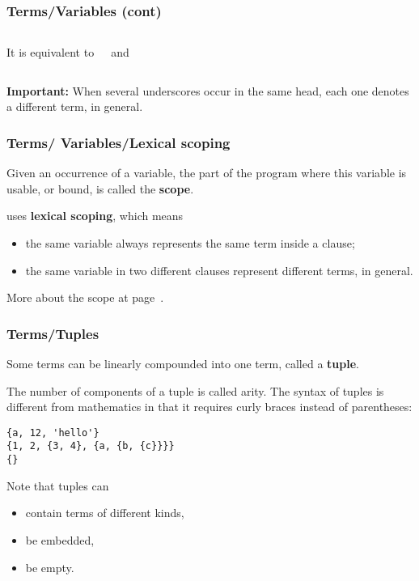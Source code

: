 %
\begin{frame}
\frametitle{Terms/Variables (cont)}

\begin{columns}

   It is equivalent to

   and

\end{columns}

\bigskip

\textbf{Important:} When several underscores occur in the same head,
each one denotes a different term, in general.

\end{frame}

%
\begin{frame}
\frametitle{Terms/ Variables/Lexical scoping}

Given an occurrence of a variable, the part of the program where
this variable is usable, or bound, is called the \textbf{scope}.

\bigskip

\Erlang uses \textbf{lexical scoping}, which means
\begin{itemize}
  
  \item the same variable always represents the same term inside a
    clause;

  \item the same variable in two different clauses represent different
    terms, in general.

\end{itemize}
More about the scope at page~\pageref{scope}.

\end{frame}

%
\begin{frame}[containsverbatim]
\frametitle{Terms/Tuples}

Some terms can be linearly compounded into one term, called a
\textbf{tuple}.

\bigskip

The number of components of a tuple is called arity.
The syntax of tuples is different from mathematics in that it requires
curly braces instead of parentheses: 
\begin{verbatim}
{a, 12, 'hello'}
{1, 2, {3, 4}, {a, {b, {c}}}}
{}
\end{verbatim}
Note that tuples can
\begin{itemize}

  \item contain terms of different kinds,

  \item be embedded,

  \item be empty.

\end{itemize}

\end{frame}

